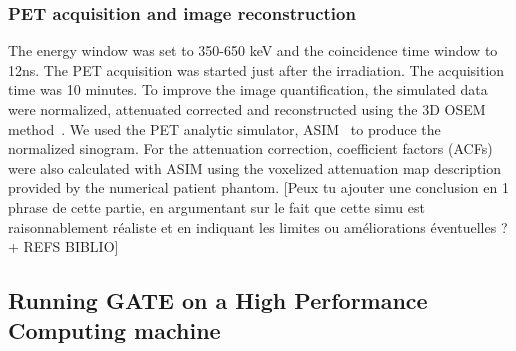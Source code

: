 \documentclass[11pt]{iopart}
\newcommand{\dsnote}[1]{{\color{green}[#1]}}
\newcommand{\sjnote}[1]{{\color{red}[#1]}}
\begin{document}

\subsubsection{PET acquisition and image reconstruction}

The energy window was set to 350-650 keV and the coincidence time
window to 12ns. The PET acquisition was started just after the
irradiation. The acquisition time was 10 minutes.  To improve the
image quantification, the simulated data were normalized, attenuated
corrected and reconstructed using the 3D OSEM
method~\cite{OSEM_ref}. We used the PET analytic simulator,
ASIM~\cite{Comtat1999} to produce the normalized sinogram. For the
attenuation correction, coefficient factors (ACFs) were also
calculated with ASIM using the voxelized attenuation map description
provided by the numerical patient phantom. \dsnote{Peux tu ajouter une
  conclusion en 1 phrase de cette partie, en argumentant sur le fait
  que cette simu est raisonnablement réaliste et en indiquant les
  limites ou améliorations éventuelles ? + REFS BIBLIO}

\subsection{Running GATE on a High Performance Computing machine}
\end{document}
